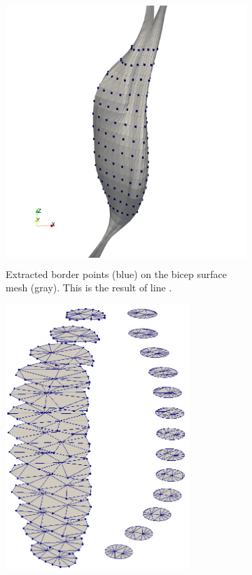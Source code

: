 %
\begin{figure}%
  \centering%
  \begin{subfigure}[t]{0.49\textwidth}%
    \centering%
    \includegraphics[height=10cm]{images/fiber_creation/serial_alg_0.png}%
    \caption{Extracted border points (blue) on the bicep surface mesh (gray). This is the result of line .}%
    \label{fig:serial_alg_0}%
  \end{subfigure}
  \begin{subfigure}[t]{0.49\textwidth}%
    \centering%
    \includegraphics[height=10cm]{images/fiber_creation/serial_alg_3.png}%
    \caption{}%
    \label{fig:serial_alg_3}%
  \end{subfigure}\\

\end{figure}
